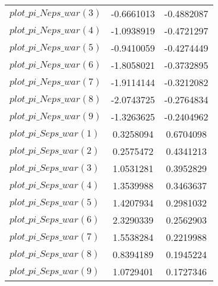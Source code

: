\begin{center}
\begin{longtable}{lcc}
$plot\_pi\_N eps\_war (3)   $	 & 	     -0.6661013	 & 	     -0.4882087 \\ 
$plot\_pi\_N eps\_war (4)   $	 & 	     -1.0938919	 & 	     -0.4721297 \\ 
$plot\_pi\_N eps\_war (5)   $	 & 	     -0.9410059	 & 	     -0.4274449 \\ 
$plot\_pi\_N eps\_war (6)   $	 & 	     -1.8058021	 & 	     -0.3732895 \\ 
$plot\_pi\_N eps\_war (7)   $	 & 	     -1.9114144	 & 	     -0.3212082 \\ 
$plot\_pi\_N eps\_war (8)   $	 & 	     -2.0743725	 & 	     -0.2764834 \\ 
$plot\_pi\_N eps\_war (9)   $	 & 	     -1.3263625	 & 	     -0.2404962 \\ 
$plot\_pi\_S eps\_war (1)   $	 & 	      0.3258094	 & 	      0.6704098 \\ 
$plot\_pi\_S eps\_war (2)   $	 & 	      0.2575472	 & 	      0.4341213 \\ 
$plot\_pi\_S eps\_war (3)   $	 & 	      1.0531281	 & 	      0.3952829 \\ 
$plot\_pi\_S eps\_war (4)   $	 & 	      1.3539988	 & 	      0.3463637 \\ 
$plot\_pi\_S eps\_war (5)   $	 & 	      1.4207934	 & 	      0.2981032 \\ 
$plot\_pi\_S eps\_war (6)   $	 & 	      2.3290339	 & 	      0.2562903 \\ 
$plot\_pi\_S eps\_war (7)   $	 & 	      1.5538284	 & 	      0.2219988 \\ 
$plot\_pi\_S eps\_war (8)   $	 & 	      0.8394189	 & 	      0.1945224 \\ 
$plot\_pi\_S eps\_war (9)   $	 & 	      1.0729401	 & 	      0.1727346 \\ 
\end{longtable}
 \end{center}
